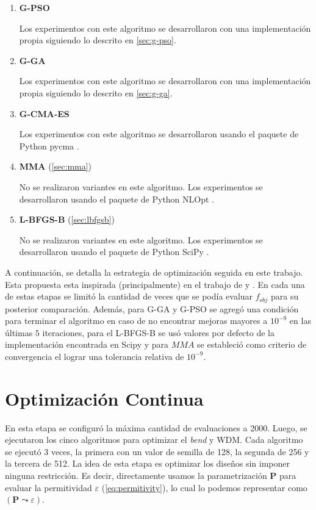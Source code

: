 \begin{enumerate}
  \item \textbf{G-PSO}
  
  Los experimentos con este algoritmo se desarrollaron con una implementación propia siguiendo lo descrito
    en \autoref{sec:g-pso}.

  \item \textbf{G-GA}


  Los experimentos con este algoritmo se desarrollaron con una implementación propia siguiendo lo descrito
    en \autoref{sec:g-ga}.

  \item \textbf{G-CMA-ES}

  Los experimentos con este algoritmo se desarrollaron usando el paquete de Python pycma
  \citep{hansen2019pycma}.

  \item \textbf{MMA} (\autoref{sec:mma})

  No se realizaron variantes en este algoritmo.
  Los experimentos se desarrollaron usando el paquete de Python NLOpt \citep{nlopt}.

  \item \textbf{L-BFGS-B} (\autoref{sec:lbfgsb})

  No se realizaron variantes en este algoritmo.
  Los experimentos se desarrollaron usando el paquete de Python SciPy \citep{2020SciPy-NMeth}.

\end{enumerate}

A continuación, se detalla la estrategia de optimización seguida en este trabajo.
Esta propuesta esta inspirada (principalmente) en el trabajo de \cite{Su2020} y \cite{Christiansen2021}.
En cada una de estas etapas se limitó la cantidad de veces que se podía evaluar $f_{obj}$ para su
posterior comparación. Además, para G-GA y G-PSO se agregó una condición para terminar el algoritmo
en caso de no encontrar mejoras mayores a $10^{-9}$ en las últimas $5$ iteraciones, 
para el L-BFGS-B se usó valores por defecto de la implementación encontrada en Scipy y 
para $MMA$ se estableció como criterio de convergencia el lograr
una tolerancia relativa de $10^{-9}$.

\section{Optimización Continua}

En esta etapa se configuró la máxima cantidad de evaluaciones a 2000.
Luego, se ejecutaron los cinco algoritmos para optimizar el \emph{bend} y WDM.
Cada algoritmo se ejecutó 3 veces, la primera con un valor de semilla de 128, la segunda de 256 y
la tercera de 512.
La idea de esta etapa es optimizar los diseños sin imponer ninguna restricción.
Es decir, directamente usamos la parametrización $\boldsymbol{P}$ para evaluar la permitividad 
$\varepsilon$ (\autoref{eq:permitivity}),
lo cual lo podemos representar como $(\boldsymbol{P} \mathrel{\leadsto} \varepsilon)$.

